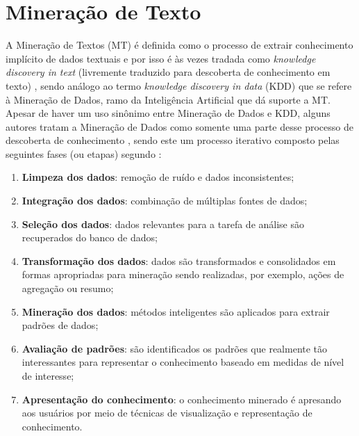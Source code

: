 \section{Mineração de Texto} \label{sec:MineraçãoTexto}
A Mineração de Textos (MT) é definida como o processo de extrair conhecimento implícito de dados textuais \cite{Jo2018TMCIBDC,Feldman:2006:TMH:1076381} e por isso é às vezes tradada como \textit{knowledge discovery in text} (livremente traduzido para descoberta de conhecimento em texto) \cite{Kodratoff:1999:KDT:646358.689959, Feldman:1995:KDT:3001335.3001354}, sendo análogo ao termo \textit{knowledge discovery in data} (KDD) que se refere à Mineração de Dados, ramo da Inteligência Artificial que dá suporte a MT. 
Apesar de haver um uso sinônimo entre Mineração de Dados e KDD, alguns autores tratam a Mineração de Dados como somente uma parte desse processo de descoberta de conhecimento \cite[p.~6]{Han:2011:DMC:1972541}, sendo este um processo iterativo composto pelas seguintes fases (ou etapas) segundo :
\begin{enumerate}
    \item \textbf{Limpeza dos dados}: remoção de ruído e dados inconsistentes;
    \item \textbf{Integração dos dados}: combinação de múltiplas fontes de dados;
    \item \textbf{Seleção dos dados}: dados relevantes para a tarefa de análise são recuperados do banco de dados;
    \item \textbf{Transformação dos dados}: dados são transformados e consolidados em formas apropriadas para mineração sendo realizadas, por exemplo, ações de agregação ou resumo;
    \item \textbf{Mineração dos dados}: métodos inteligentes são aplicados para extrair padrões de dados;
    \item \textbf{Avaliação de padrões}: são identificados os padrões que realmente tão interessantes para representar o conhecimento baseado em medidas de nível de interesse;
    \item \textbf{Apresentação do conhecimento}: o conhecimento minerado é apresando aos usuários por meio de técnicas de visualização e representação de conhecimento.
\end{enumerate}
